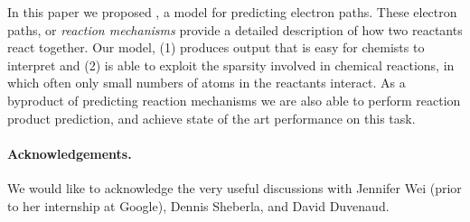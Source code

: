
In this paper we proposed \ourModel, a model for predicting electron paths.
These electron paths, or {\em reaction mechanisms} provide a detailed description of how two reactants react together. 
Our model, (1) produces output that is easy for chemists to interpret and (2) is able to exploit the sparsity involved in chemical reactions, in which often only small numbers of atoms in the reactants interact.
As a byproduct of predicting reaction mechanisms we are also able to perform reaction product prediction,
 and achieve state of the art performance on this task.

 \paragraph{Acknowledgements.}
We would like to acknowledge the very useful discussions with Jennifer Wei (prior to her internship at Google), Dennis Sheberla, and David Duvenaud.
